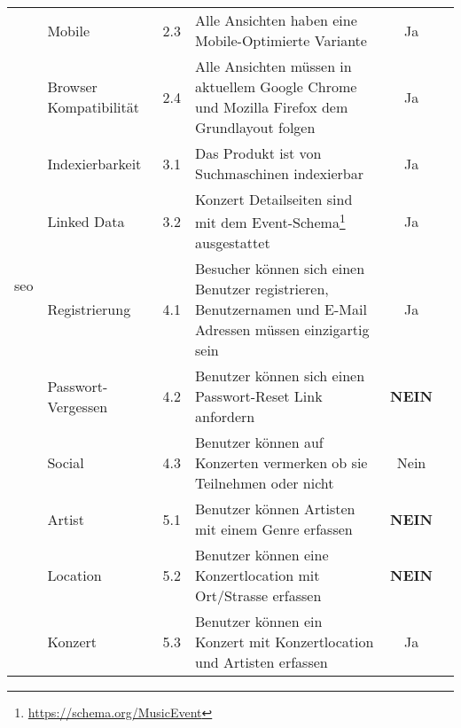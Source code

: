 \begin{longtable}[]{@{}p{1.9cm}p{2.5cm}cp{5.5cm}cc@{}}
                                  & Mobile                     & 2.3          & Alle Ansichten haben eine Mobile-Optimierte Variante                                                        & Ja                              \\ \cline{2-6}
                                  & Browser Kompatibilität     & 2.4          & Alle Ansichten müssen in aktuellem Google Chrome und Mozilla Firefox dem Grundlayout folgen                 & Ja                              \\
  \midrule
  \multirow{4}{*}{\acrshort{seo}} & Indexierbarkeit            & 3.1          & Das Produkt ist von Suchmaschinen indexierbar                                                               & Ja                              \\ \cline{2-6}
                                  & Linked Data                & 3.2          & Konzert Detailseiten sind mit dem Event-Schema\footnote{\url{https://schema.org/MusicEvent}} ausgestattet   & Ja                              \\
  \midrule
  \multirow{8}{*}{Benutzer}       & Registrierung              & 4.1          & Besucher können sich einen Benutzer registrieren, Benutzernamen und E-Mail Adressen müssen einzigartig sein & Ja                              \\ \cline{2-6}
                                  & Passwort-Vergessen         & 4.2          & Benutzer können sich einen Passwort-Reset Link anfordern                                                    & \textbf{NEIN}                   \\ \cline{2-6}
                                  & Social                     & 4.3          & Benutzer können auf Konzerten vermerken ob sie Teilnehmen oder nicht                                        & Nein                            \\
  \midrule
  \clearpage
  \multirow{6}{*}{Erfassung}      & Artist                     & 5.1          & Benutzer können Artisten mit einem Genre erfassen                                                           & \textbf{NEIN}                   \\ \cline{2-6}
                                  & Location                   & 5.2          & Benutzer können eine Konzertlocation mit Ort/Strasse erfassen                                               & \textbf{NEIN}                   \\ \cline{2-6}
                                  & Konzert                    & 5.3          & Benutzer können ein Konzert mit Konzertlocation und Artisten erfassen                                       & Ja                              \\ \cline{2-6}

\end{longtable}
